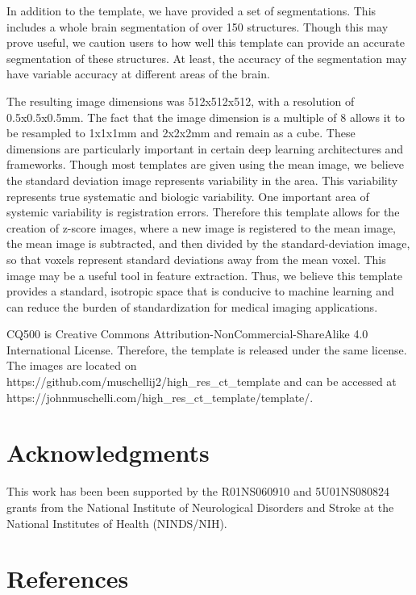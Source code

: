 \documentclass[]{elsarticle} %
\begin{document}
In addition to the template, we have provided a set of segmentations. This includes a whole brain segmentation of over 150 structures. Though this may prove useful, we caution users to how well this template can provide an accurate segmentation of these structures. At least, the accuracy of the segmentation may have variable accuracy at different areas of the brain.

The resulting image dimensions was 512x512x512, with a resolution of 0.5x0.5x0.5mm. The fact that the image dimension is a multiple of 8 allows it to be resampled to 1x1x1mm and 2x2x2mm and remain as a cube. These dimensions are particularly important in certain deep learning architectures and frameworks. Though most templates are given using the mean image, we believe the standard deviation image represents variability in the area. This variability represents true systematic and biologic variability. One important area of systemic variability is registration errors. Therefore this template allows for the creation of z-score images, where a new image is registered to the mean image, the mean image is subtracted, and then divided by the standard-deviation image, so that voxels represent standard deviations away from the mean voxel. This image may be a useful tool in feature extraction. Thus, we believe this template provides a standard, isotropic space that is conducive to machine learning and can reduce the burden of standardization for medical imaging applications.

CQ500 is Creative Commons Attribution-NonCommercial-ShareAlike 4.0 International License. Therefore, the template is released under the same license. The images are located on https://github.com/muschellij2/high\_res\_ct\_template and can be accessed at https://johnmuschelli.com/high\_res\_ct\_template/template/.

\hypertarget{acknowledgments}{%
\section{Acknowledgments}\label{acknowledgments}}

This work has been been supported by the R01NS060910 and 5U01NS080824 grants from the National Institute of Neurological Disorders and Stroke at the National Institutes of Health (NINDS/NIH).

\hypertarget{references}{%
\section*{References}\label{references}}
\end{document}
